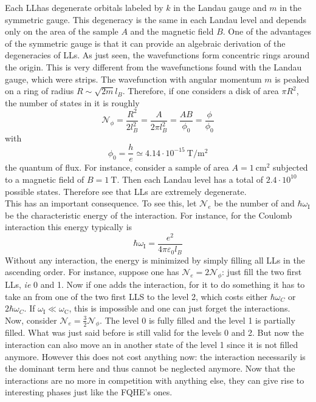 		Each LLhas degenerate orbitals labeled by $k$ in the Landau gauge and $m$ in the symmetric gauge. This degeneracy is the same in each Landau level and depends only on the area of the sample $A$ and the magnetic field $B$.
		One of the advantages of the symmetric gauge is that it can provide an algebraic derivation of the degeneracies of LLs. As just seen, the wavefunctions form concentric rings around the origin. This is very different from the wavefunctions found with the Landau gauge, which were strips. The wavefunction with angular momentum $m$ is peaked on a ring of radius $ R \sim \sqrt{2m}l_B$. Therefore, if one considers a disk of area $\pi R^2$, the number of states in it is roughly
		\begin{equation}
		    \mathcal{N}_\phi=\frac{R^2}{2l_B^2}=\frac{A}{2\pi l_B^2}=\frac{AB}{\phi_0}=\frac{\phi}{\phi_0}
		\end{equation}
		with
		\begin{equation}
		    \phi_0=\frac{h}{e}\simeq 4.14\cdot 10^{-15}~\mathrm{T/m^2}
		\end{equation}
		the quantum of flux. For instance, consider a sample of area $A=1~\mathrm{cm^2}$ subjected to a magnetic field of $B=1~\text{T}$. Then each Landau level has a total of $2.4\cdot 10^{10}$ possible states. Therefore see that LLs are extremely degenerate.\\

		This has an important consequence. To see this, let $\mathcal{N}_e$ be the number of \electron and $\hbar\omega_\text{I}$ be the characteristic energy of the interaction. For instance, for the Coulomb interaction this energy typically is
		\begin{equation}
		    \hbar\omega_\text{I}=\frac{e^2}{4\pi\varepsilon_0l_B}
		\end{equation}
		Without any interaction, the energy is minimized by simply filling all LLs in the ascending order. For instance, suppose one has $\mathcal{N}_e=2\mathcal{N}_\phi$: just fill the two first LLs, \emph{ie} 0 and 1. Now if one adds the interaction, for it to do something it has to take an \electron from one of the two first LLS to the level 2, which costs either $\hbar\omega_C$ or $2\hbar\omega_C$. If $\omega_\text{I}\ll\omega_\text{C}$, this is impossible and one can just forget the interactions. Now, consider $\mathcal{N}_e=\frac32\mathcal{N}_\phi$. The level 0 is fully filled and the level 1 is partially filled. What was just said before is still valid for the levels 0 and 2. But now the interaction can also move an \electron in another state of the level 1 since it is not filled anymore. However this does not cost anything now: the interaction necessarily is the dominant term here and thus cannot be neglected anymore. Now that the interactions are no more in competition with anything else, they can give rise to interesting phases just like the FQHE's ones.\\

